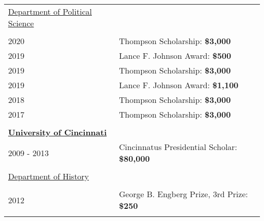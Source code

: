 \documentclass[margin,line,pifont,palatino,courier]{res}
\newenvironment{list1}{
  \begin{list}{\ding{113}}{%
      \setlength{\itemsep}{0in}
      \setlength{\parsep}{0in} \setlength{\parskip}{0in}
      \setlength{\topsep}{0in} \setlength{\partopsep}{0in}
      \setlength{\leftmargin}{0.17in}}}{\end{list}}
\begin{document}
\begin{resume}
\begin{tabular}{ll}
  \\
  \underline{Department of Political Science}&\\
  \\
  2020       & Thompson Scholarship: \bf{\$3,000}\\
  2019       & Lance F. Johnson Award: \bf{\$500}\\
  2019       & Thompson Scholarship: \bf{\$3,000}\\
  2019       & Lance F. Johnson Award: \bf{\$1,100}\\
  2018       & Thompson Scholarship: \bf{\$3,000}\\
  2017       & Thompson Scholarship: \bf{\$3,000}\\
  \\
  \textbf{\underline{University of Cincinnati}}&\\
  2009 - 2013 & Cincinnatus Presidential Scholar: \bf{\$80,000}\\
  \\
  \underline{Department of History}&\\
  \\
  2012       & George B. Engberg Prize, 3rd Prize: \bf{\$250}  \\
  \\
\end{tabular}




\end{resume}
\end{document}
